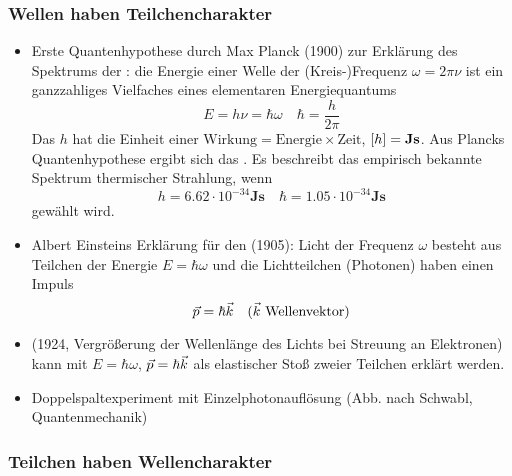 \subsubsection{Wellen haben Teilchencharakter}

\begin{itemize}
  \item Erste Quantenhypothese durch Max Planck (1900) zur Erklärung des Spektrums der : die Energie einer Welle der (Kreis-)Frequenz $\omega = 2\pi\nu$ ist ein ganzzahliges Vielfaches eines elementaren Energiequantums
  \begin{equation}
    E = h \nu = \hbar \omega \quad \hbar = \frac{h}{2\pi}
  \end{equation}
  Das  $h$ hat die Einheit einer $\text{Wirkung} = \text{Energie} \times \text{Zeit}$, $\left[ h \right] = \textbf{Js}$. Aus Plancks Quantenhypothese ergibt sich das . Es beschreibt das empirisch bekannte Spektrum thermischer Strahlung, wenn
  \begin{equation}
    h = 6.62\cdot 10^{-34} \textbf{Js} \quad \hbar = 1.05\cdot 10^{-34} \textbf{Js}
  \end{equation}
  gewählt wird.
  \item Albert Einsteins Erklärung für den  (1905): Licht der Frequenz $\omega$ besteht aus Teilchen der Energie $E = \hbar \omega$ und die Lichtteilchen (Photonen) haben einen Impuls
  \begin{equation}
    \vec{p} = \hbar \vec{k} \quad \text{($\vec{k}$ Wellenvektor)}
  \end{equation}
  \item {} (1924, Vergrößerung der Wellenlänge des Lichts bei Streuung an Elektronen) kann mit $E = \hbar \omega$, $\vec{p} = \hbar \vec{k}$ als elastischer Stoß zweier Teilchen erklärt werden.
  \item Doppelspaltexperiment mit Einzelphotonauflösung (Abb. nach Schwabl, Quantenmechanik)
\end{itemize}

\begin{figure}[H]
  \centering
  
\end{figure}

\subsubsection{Teilchen haben Wellencharakter}

